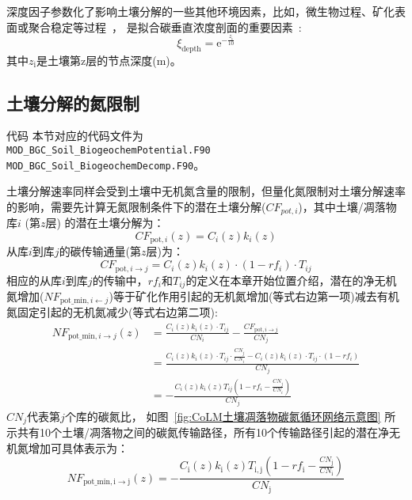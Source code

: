 深度因子参数化了影响土壤分解的一些其他环境因素，比如，微生物过程、矿化表面或聚合稳定等过程~\citep{koven2013effect}，
是拟合碳垂直浓度剖面的重要因素~\citep{jenkinson2008turnover}:
\begin{equation}
  \xi_{\mathrm{d e p t h}}={\mathrm e}^{-\frac{z_{\mathrm{i}}}{10}}
\end{equation}
其中$z_{\mathrm{i}}$是土壤第z层的节点深度(m)。


\subsection{土壤分解的氮限制}\label{土壤分解的氮限制}
\begin{mymdframed}{代码}
  本节对应的代码文件为\\ \texttt{MOD\_BGC\_Soil\_BiogeochemPotential.F90}\\
  \texttt{MOD\_BGC\_Soil\_BiogeochemDecomp.F90}。
\end{mymdframed}

土壤分解速率同样会受到土壤中无机氮含量的限制，但量化氮限制对土壤分解速率的影响，需要先计算无氮限制条件下的潜在土壤分解($CF_{pot,i}$)，其中土壤/凋落物库$i$ (第$z$层) 的潜在土壤分解为：
\begin{equation}
  C F_{\mathrm{pot},i}(z)=C_{i}(z) k_{i}(z)
\end{equation}
从库$i$到库$j$的碳传输通量(第$z$层)为：
\begin{equation}
  C F_{\mathrm{pot}, i \rightarrow j}=C_{i}(z) k_{i}(z) \cdot\left(1-r f_{i}\right) \cdot T_{i j}
\end{equation}
相应的从库$i$到库$j$的传输中，$r f_{i}$和$T_{i j}$的定义在本章开始位置介绍，潜在的净无机氮增加($NF_{\mathrm{pot\_min,}i\gets j}$)等于矿化作用引起的无机氮增加(等式右边第一项)减去有机氮固定引起的无机氮减少(等式右边第二项):
\begin{equation}
  \begin{aligned}
    NF_{\mathrm{pot\_min}, i \rightarrow j}\left(z\right)&=\frac{C_{i}(z) k_{i}(z) \cdot T_{ij}}{C N_{i}}-\frac{C F_{\mathrm{pot}, i \rightarrow j}}{C N_{j}} \\
    & =\frac{C_{i}(z) k_{i}(z) \cdot T_{i j} \cdot \frac{C N_{j}}{C N_{i}}-C_{i}(z) k_{i}(z) \cdot T_{i j} \cdot\left(1-r f_{i}\right)}{C N_{j}} \\
    &=-\frac{C_{i}(z) k_{i}(z) T_{i j}\left(1-r f_{i}-\frac{C N_{j}}{C N_{i}}\right)}{C N_{j}}
  \end{aligned}
\end{equation}
$C N_{j}$代表第$j$个库的碳氮比，
如图~\ref{fig:CoLM土壤凋落物碳氮循环网络示意图} 所示共有10个土壤/凋落物之间的碳氮传输路径，所有10个传输路径引起的潜在净无机氮增加可具体表示为：
\begin{equation}\label{NF_pot_minmet}
  NF_{\mathrm{{pot}\_{min,i \rightarrow {j}}}}(z)=-\frac{C_{\mathrm{{i}}}(z) k_{\mathrm{{i}}}(z) T_{\mathrm{i, j}}\left(1-r f_{\mathrm{i}}-\frac{C N_{\mathrm{{j }}}}{C N_{\mathrm{i}}}\right)}{C N_{\mathrm{{j }}}}
\end{equation}

